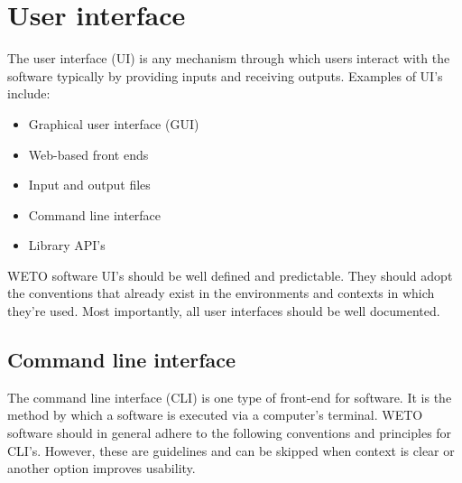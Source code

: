 \documentclass[]{nrel}
\begin{document}
\section{User interface}
The user interface (UI) is any mechanism through which users interact with the software
typically by providing inputs and receiving outputs. Examples of UI's include:

\begin{itemize}
\item Graphical user interface (GUI)
\item Web-based front ends
\item Input and output files
\item Command line interface
\item Library API's
\end{itemize}

WETO software UI's should be well defined and predictable.
They should adopt the conventions that already exist in the environments and contexts
in which they're used.
Most importantly, all user interfaces should be well documented.

\subsection{Command line interface}
The command line interface (CLI) is one type of front-end for software.
It is the method by which a software is executed via a computer’s terminal.
WETO software should in general adhere to the following conventions and principles for CLI’s.
However, these are guidelines and can be skipped when context is clear or another
option improves usability.
\end{document}
